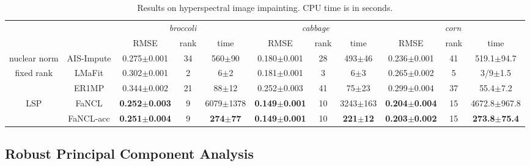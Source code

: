 \documentclass[10pt,journal,compsoc]{IEEEtran}
\begin{document}
\begin{table*}[ht]
\centering
\caption{Results on hyperspectral image impainting.
	CPU time is in seconds.
	}

\vspace{-10px}
\begin{tabular}{c|c|c c c|c c c|c c c}
	\hline
           &                     &        \multicolumn{3}{c|}{\textit{broccoli}}         &         \multicolumn{3}{c|}{\textit{cabbage}}         &             \multicolumn{3}{c}{\textit{corn}}             \\
           &                     &           RMSE           & rank & time                &           RMSE           & rank & time                &           RMSE           & rank & time                    \\ \hline
	nuclear norm & \textsf{AIS-Impute} &     0.275$\pm$0.001      & 34   & 560$\pm$90          &     0.180$\pm$0.001      & 28   & 493$\pm$46          &     0.236$\pm$0.001      & 41   & 519.1$\pm$94.7          \\ \hline\hline
 fixed rank  &   \textsf{LMaFit}   &     0.302$\pm$0.001      & 2    & 6$\pm$2             &     0.181$\pm$0.001      & 3    & 6$\pm$3             &     0.265$\pm$0.002      & 5    & 3/9$\pm$1.5             \\ \cline{2-11}
           &   \textsf{ER1MP}    &     0.344$\pm$0.002      & 21   & 88$\pm$12           &     0.252$\pm$0.003      & 41   & 75$\pm$23           &     0.299$\pm$0.004      & 37   & 55.4$\pm$7.2            \\ \hline\hline
  LSP      &   \textsf{FaNCL}    & \textbf{0.252$\pm$0.003} & 9    & 6079$\pm$1378       & \textbf{0.149$\pm$0.001} & 10   & 3243$\pm$163        & \textbf{0.204$\pm$0.004} & 15   & 4672.8$\pm$967.8        \\ \cline{2-11}
           & \textsf{FaNCL-acc}  & \textbf{0.251$\pm$0.004} & 9    & \textbf{274$\pm$77} & \textbf{0.149$\pm$0.001} & 10   & \textbf{221$\pm$12} & \textbf{0.203$\pm$0.002} & 15   & \textbf{273.8$\pm$75.4} \\ \hline
\end{tabular}
\label{tab:hyper}
\end{table*}





\subsection{Robust Principal Component Analysis}
\label{sec:expt2}
\end{document}

